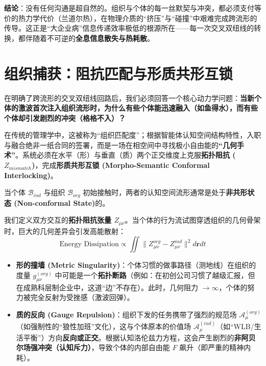 \textbf{结论}：没有任何沟通是超自然的。组织与个体的每一丝默契与冲突，都必须支付等价的热力学代价（兰道尔热），在物理介质的“挤压”与“碰撞”中艰难完成跨流形的传导。这正是“大企业病”信息传递效率极低的根源所在——每一次交叉双纽线的转换，都伴随着不可逆的\textbf{全息信息散失与热耗散}。

\section{组织捕获：阻抗匹配与形质共形互锁}
\label{sec:organizational_capture_interlocking}

在明确了跨流形的交叉双纽线回路后，我们必须回答一个核心动力学问题：\textbf{当新个体的激波首次注入组织流形时，为什么有些个体能迅速融入（如鱼得水），而有些个体却引发剧烈的冲突（格格不入）？}

在传统的管理学中，这被称为“组织匹配度”；根据智能体认知空间结构特性，入职与融合绝非一纸合同的签署，而是一场在相空间中寻找极小自由能的\textbf{“几何手术”}。系统必须在水平（形）与垂直（质）两个正交维度上克服\textbf{拓扑阻抗 ($Z_{mismatch}$)}，完成\textbf{形质共形互锁 (Morpho-Semantic Conformal Interlocking)}。


当个体 $\mathcal{B}_{ind}$ 与组织 $\mathcal{B}_{org}$ 初始接触时，两者的认知空间流形通常是处于\textbf{非共形状态 (Non-conformal State)}的。

我们定义双方交互的\textbf{拓扑阻抗张量 $Z_{\mu\nu}$}。当个体的行为流试图穿透组织的几何骨架时，巨大的几何差异会引发高能散射：
$$ \text{Energy Dissipation} \propto \iint \| Z_{\mu\nu}^{org} - Z_{\mu\nu}^{ind} \|^2 d\mathbf{r} dt $$

\begin{itemize}
    \item \textbf{形的撞墙 (Metric Singularity)}：个体习惯的做事路径（测地线）在组织的度量 $g_{\mu\nu}^{(org)}$ 中可能是一个\textbf{拓扑断路}（例如：在初创公司习惯了越级汇报，但在成熟科层制企业中，这道“边”不存在）。此时，几何阻力 $\to \infty$，个体的努力被完全反射为受挫感（激波回弹）。
    \item \textbf{质的反向 (Gauge Repulsion)}：组织下发的任务携带了强烈的规范场 $\mathcal{A}_\mu^{(org)}$（如强制性的“狼性加班”文化），这与个体原本的价值场 $\mathcal{A}_\mu^{(ind)}$（如“WLB/生活平衡”）方向\textbf{反向或正交}。根据认知洛伦兹力方程，这会产生剧烈的\textbf{非阿贝尔场强冲突（认知斥力）}，导致个体的内部自由能 $F$ 飙升（即严重的精神内耗）。
\end{itemize}


